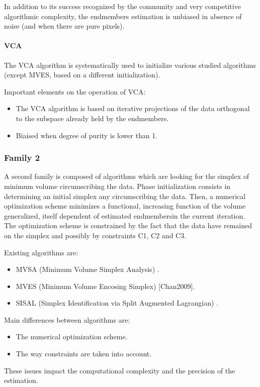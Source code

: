 In addition to its success recognized by the
community and very competitive algorithmic complexity, the endmembers estimation is unbiased in absence of noise (and when there are pure pixels).

\paragraph{VCA} 
The VCA algorithm is systematically
used to initialize various studied algorithms (except
MVES, based on a different initialization).

Important elements on the operation of VCA:
\begin{itemize}
\item {The VCA algorithm
is based on iterative projections of the data orthogonal to
the subspace already held by the endmembers.}
\item {Biaised when degree of purity is lower than 1.}
\end{itemize}  

\subsubsection{Family 2} 
A second family is composed of algorithms which are looking for the simplex of minimum
volume circumscribing the data. Phase initialization consists in determining
an initial simplex any circumscribing the data. Then, a numerical
optimization scheme minimizes a functional, increasing function of the
volume generalized, itself dependent of estimated endmembersin the
current iteration. The optimization scheme is constrained by the fact that the
data have remained on the simplex and possibly by constraints C1, C2 and C3.

Existing algorithms are: 
\begin{itemize}
\item {MVSA (Minimum Volume Simplex
Analysis) \cite{Li2008}.}
\item { MVES (Minimum Volume Encosing Simplex)
[Chan2009].}
\item {SISAL (Simplex Identification via Split Augmented
Lagrangian) \cite{Dias2009}.}
\end{itemize}  
  
Main differences between algorithms are: 
\begin{itemize}
\item {The numerical optimization scheme.}
\item {The way
constraints are taken into account.}

\end{itemize}  
These issues impact the computational complexity and the precision of the estimation.
 
